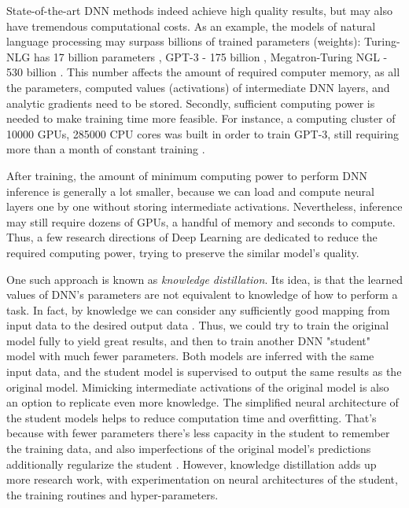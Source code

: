 State-of-the-art DNN methods indeed achieve high quality results, but may also have tremendous computational costs. As an example, the models of natural language processing may surpass billions of trained parameters (weights): Turing-NLG has 17 billion parameters \cite{dnn:turingnlg20}, GPT-3 - 175 billion \cite{dnn:gpt3-20}, Megatron-Turing NGL - 530 billion \cite{dnn:megatron22}. This number affects the amount of required computer memory, as all the parameters, computed values (activations) of intermediate DNN layers, and analytic gradients need to be stored. Secondly, sufficient computing power is needed to make training time more feasible. For instance, a computing cluster of 10000 GPUs, 285000 CPU cores was built in order to train GPT-3, still requiring more than a month of constant training \cite{aux:openai-cluster-20}. 

After training, the amount of minimum computing power to perform DNN inference is generally a lot smaller, because we can load and compute neural layers one by one without storing intermediate activations. Nevertheless, inference may still require dozens of GPUs, a handful of memory and seconds to compute. Thus, a few research directions of Deep Learning are dedicated to reduce the required computing power, trying to preserve the similar model's quality.

One such approach is known as \textit{knowledge distillation}. Its idea, is that the learned values of DNN's parameters are not equivalent to knowledge of how to perform a task. In fact, by knowledge we can consider any sufficiently good mapping from input data to the desired output data \cite{method:distillation15}. Thus, we could try to train the original model fully to yield great results, and then to train another DNN "student" model with much fewer parameters. Both models are inferred with the same input data, and the student model is supervised to output the same results as the original model. Mimicking intermediate activations of the original model is also an option to replicate even more knowledge. The simplified neural architecture of the student models helps to reduce computation time and overfitting. That's because with fewer parameters there's less capacity in the student to remember the training data, and also imperfections of the original model's predictions additionally regularize the student \cite{survey:distillation21, speed:distillgan19}. However, knowledge distillation adds up more research work, with experimentation on neural architectures of the student, the training routines and hyper-parameters.

